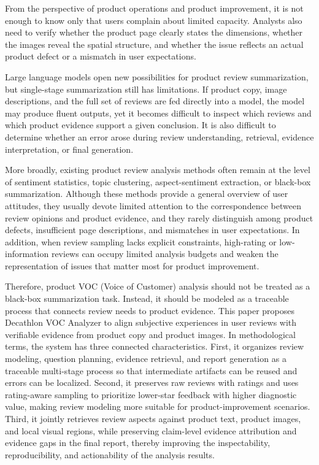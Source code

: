 \documentclass[11pt]{article}
\begin{document}
From the perspective of product operations and product improvement, it is not enough to know only that users complain about limited capacity. Analysts also need to verify whether the product page clearly states the dimensions, whether the images reveal the spatial structure, and whether the issue reflects an actual product defect or a mismatch in user expectations.

Large language models open new possibilities for product review summarization, but single-stage summarization still has limitations. If product copy, image descriptions, and the full set of reviews are fed directly into a model, the model may produce fluent outputs, yet it becomes difficult to inspect which reviews and which product evidence support a given conclusion. It is also difficult to determine whether an error arose during review understanding, retrieval, evidence interpretation, or final generation.

More broadly, existing product review analysis methods often remain at the level of sentiment statistics, topic clustering, aspect-sentiment extraction, or black-box summarization. Although these methods provide a general overview of user attitudes, they usually devote limited attention to the correspondence between review opinions and product evidence, and they rarely distinguish among product defects, insufficient page descriptions, and mismatches in user expectations. In addition, when review sampling lacks explicit constraints, high-rating or low-information reviews can occupy limited analysis budgets and weaken the representation of issues that matter most for product improvement.

Therefore, product VOC (Voice of Customer) analysis should not be treated as a black-box summarization task. Instead, it should be modeled as a traceable process that connects review needs to product evidence. This paper proposes Decathlon VOC Analyzer to align subjective experiences in user reviews with verifiable evidence from product copy and product images. In methodological terms, the system has three connected characteristics. First, it organizes review modeling, question planning, evidence retrieval, and report generation as a traceable multi-stage process so that intermediate artifacts can be reused and errors can be localized. Second, it preserves raw reviews with ratings and uses rating-aware sampling to prioritize lower-star feedback with higher diagnostic value, making review modeling more suitable for product-improvement scenarios. Third, it jointly retrieves review aspects against product text, product images, and local visual regions, while preserving claim-level evidence attribution and evidence gaps in the final report, thereby improving the inspectability, reproducibility, and actionability of the analysis results.
\end{document}
